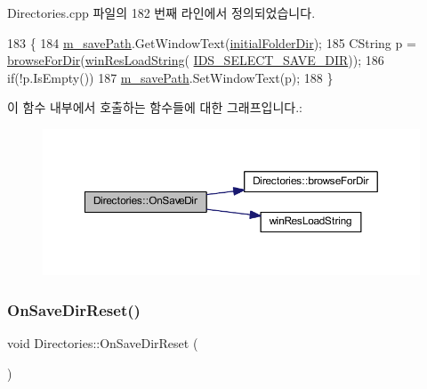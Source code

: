 Directories.\+cpp 파일의 182 번째 라인에서 정의되었습니다.


\begin{DoxyCode}
183 \{
184   \mbox{\hyperlink{class_directories_a9293c8e99ad84e8a78d127ff09534d6c}{m\_savePath}}.GetWindowText(\mbox{\hyperlink{class_directories_a5f307fd959af44c194c520b5452cafba}{initialFolderDir}});
185   CString p = \mbox{\hyperlink{class_directories_a7e24bf265fe6af9c01e0939952c337e1}{browseForDir}}(\mbox{\hyperlink{_win_res_util_8cpp_a416e85e80ab9b01376e87251c83d1a5a}{winResLoadString}}(
      \mbox{\hyperlink{resource_8h_a5c8d55976a6809fcb7de680e3bf32fc7}{IDS\_SELECT\_SAVE\_DIR}}));
186   \textcolor{keywordflow}{if}(!p.IsEmpty())
187     \mbox{\hyperlink{class_directories_a9293c8e99ad84e8a78d127ff09534d6c}{m\_savePath}}.SetWindowText(p);
188 \}
\end{DoxyCode}
이 함수 내부에서 호출하는 함수들에 대한 그래프입니다.\+:
\nopagebreak
\begin{figure}[H]
\begin{center}
\leavevmode
\includegraphics[width=350pt]{class_directories_a0951489dd35ed7af5fb7ea27c95fbe8e_cgraph}
\end{center}
\end{figure}
\mbox{\label{class_directories_aeb85866cbd498c057e9bf66b58a78959}} 
\subsubsection{\texorpdfstring{On\+Save\+Dir\+Reset()}{OnSaveDirReset()}}
{\footnotesize\ttfamily void Directories\+::\+On\+Save\+Dir\+Reset (\begin{DoxyParamCaption}{ }\end{DoxyParamCaption})\hspace{0.3cm}{\ttfamily [protected]}}



